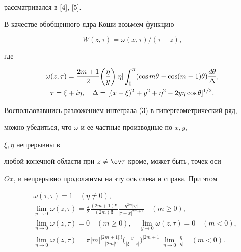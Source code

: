 рассматривался в [4], [5]. 


 


В качестве обобщенного ядра Коши возьмем функцию 


\begin{equation} 


W(z,\tau)=\omega(x,\tau)/(\tau-z), 


\end{equation} 


где 


\begin{gather} 


\omega(z,\tau)=\frac{2m+1}{2}\biggl(\frac{\eta}{y}\biggr)|\eta| 


\int^\pi_0(\cos m\theta-\cos(m+1)\theta)\frac{d\theta}{\Delta},\\ 


\tau=\xi+i\eta,\quad \Delta=[(x-\xi)^2+y^2+\eta^2- 


2y\eta\cos\theta]^{1/2}.\notag 


\end{gather} 


Воспользовавшись разложением интеграла (3) в гипергеометрический ряд, 


можно убедиться, что $\omega$ и ее частные производные по $x,y$, 


$\xi,\eta$ непрерывны в 


любой конечной области при $z\ne\ov\tau$ кроме, может быть, точек оси 


$Ox$, и непрерывно продолжимы на эту ось слева и справа. При этом 


\begin{equation} 


\begin{split} 


&\omega(\tau,\tau)=1\quad (\eta\ne 0),\\ 


&\lim_{y\to 0}\omega(z,\tau)=\frac{\pi}{2} 


\frac{(2m+1)!!}{(2m)!!}\frac{\eta^{2m}|\eta|}{|\tau-x|^{2m+1}} 


\quad (m\ge 0),\\ 


&\lim_{\eta\to 0}\omega(z,\tau)=0\quad (m\ge 0),\quad 


\lim_{y\to 0}\omega(z,\tau)=0\quad (m<0),\\ 


&\lim_{\eta\to 0}\omega(z,\tau)=\pi|m|\frac{|2m+1|!!}{|2m|!!} 


\biggl(\frac{y}{|\xi-z|}\biggr)^{|2m+1|} 


\lim_{\eta\to 0}\frac{\eta}{|\eta|}\quad (m<0). 


\end{split} 


\end{equation} 


